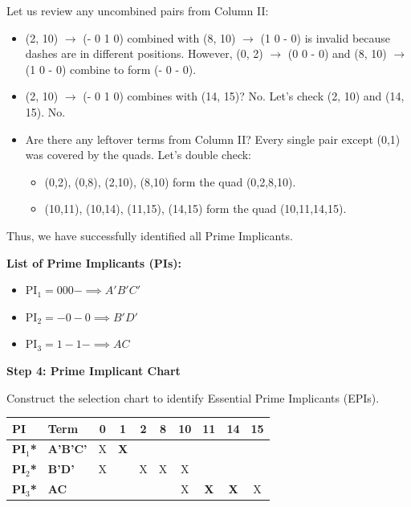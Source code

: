 \documentclass[12pt,a3paper]{article}
\begin{document}
\begin{enumerate}
\begin{tcolorbox}[enhanced,breakable,ansbox,colback=cC!4,colframe=cC,boxrule=0.8pt,arc=5pt,title={\textbf{Answer}},fonttitle=\bfseries\color{white},colbacktitle=cC]
Let us review any uncombined pairs from Column II:
\begin{itemize}
    \item (2, 10) $\rightarrow$ (- 0 1 0) combined with (8, 10) $\rightarrow$ (1 0 - 0) is invalid because dashes are in different positions. However, (0, 2) $\rightarrow$ (0 0 - 0) and (8, 10) $\rightarrow$ (1 0 - 0) combine to form (- 0 - 0).
    \item (2, 10) $\rightarrow$ (- 0 1 0) combines with (14, 15)? No. Let's check (2, 10) and (14, 15). No.
    \item Are there any leftover terms from Column II? Every single pair except (0,1) was covered by the quads. Let's double check:
    \begin{itemize}
        \item (0,2), (0,8), (2,10), (8,10) form the quad (0,2,8,10).
        \item (10,11), (10,14), (11,15), (14,15) form the quad (10,11,14,15).
    \end{itemize}
\end{itemize}

Thus, we have successfully identified all Prime Implicants.

\vspace{1.0em}
\textbf{List of Prime Implicants (PIs):}
\begin{itemize}
    \item $\text{PI}_1 = 000- \implies A'B'C'$
    \item $\text{PI}_2 = -0-0 \implies B'D'$
    \item $\text{PI}_3 = 1-1- \implies AC$
\end{itemize}

\vspace{1em}
\textbf{Step 4: Prime Implicant Chart}

Construct the selection chart to identify Essential Prime Implicants (EPIs).

\begin{center}
\renewcommand{\arraystretch}{1.2}
\begin{tabular}{llcccccccc}
\toprule
\textbf{PI} & \textbf{Term} & \textbf{0} & \textbf{1} & \textbf{2} & \textbf{8} & \textbf{10} & \textbf{11} & \textbf{14} & \textbf{15} \\
\midrule
\rowcolor{cC!10}
\textbf{PI$_1$*} & \textbf{A'B'C'} & X & \textbf{X} & & & & & & \\
\rowcolor{cC!10}
\textbf{PI$_2$*} & \textbf{B'D'}   & X & & X & X & X & & & \\
\rowcolor{cC!10}
\textbf{PI$_3$*} & \textbf{AC}     & & & & & X & \textbf{X} & \textbf{X} & X \\
\bottomrule
\end{tabular}
\end{center}


\end{tcolorbox}
\end{enumerate}
\end{document}

